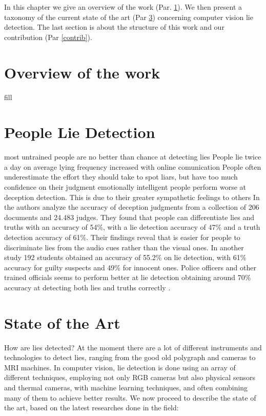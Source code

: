 In this chapter we give an overview of the work (Par. \ref{overview}). We then present a taxonomy of the current state of the art (Par \ref{sota}) concerning computer vision lie detection. The last section is about the structure of this work and our contribution (Par \ref{contrib}).

\pagebreak

\section{Overview of the work} \label{overview}
fill

\pagebreak

\section{People Lie Detection} \label{pplLieDet}
most untrained people are no better than chance at detecting lies \cite{Porter2012SecretsAL}
People lie twice a day on average \cite{LyingEverydayLife}
lying frequency \cite{DigitalDeception} increased with online comunication
People often underestimate the effort they should take to spot liars, but have too much confidence on their judgment\cite{VrijDLD}
emotionally intelligent people perform worse at deception detection. This is due to their greater sympathetic feelings to others \cite{EmotionallyIntelligent}
In \cite{BondDePauloAccuracy} the authors analyze the accuracy of deception judgments from a collection of 206 documents and 24.483 judges. They found that people can differentiate lies and truths with an accuracy of 54\%, with a lie detection accuracy of 47\% and a truth detection accuracy of 61\%. Their findings reveal that is easier for people to discriminate lies from the audio cues rather than the visual ones. In another study \cite{HartwigGranhag} 192 students obtained an accuracy of 55.2\% on lie detection, with 61\% accuracy for guilty suspects and 49\% for innocent ones. Police officers and other trained officials seems to perform better at lie detection obtaining around 70\% accuracy at detecting both lies and truths correctly \cite{VrijPoliceDetect}.


\pagebreak

\section{State of the Art} \label{sota}
How are lies detected? At the moment there are a lot of different instruments and technologies to detect lies, ranging from the good old polygraph and cameras to MRI machines. 
In computer vision, lie detection is done using an array of different techniques, employing not only RGB cameras but also physical sensors and thermal cameras, with machine learning techniques, and often combining many of them to achieve better results. 
We now proceed to describe the state of the art, based on the latest researches done in the field:

